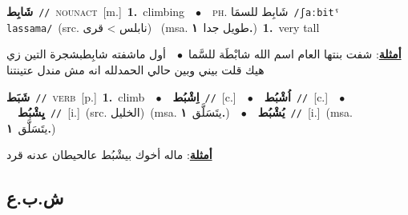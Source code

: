 \documentclass[10pt,a4paper,twoside]{article} %
\begin{document}
\begin{multicols}{2}
{\setlength\topsep{0pt}\textbf{\foreignlanguage{arabic}{شَابِط}}\ {\color{gray}\texttt{//}\color{black}}\ \textsc{noun\textunderscore act}\ [m.]\ \textbf{1.}~climbing\ \ $\bullet$\ \ \textsc{ph.} \color{gray} \foreignlanguage{arabic}{شَابِط للسمَا}\color{black}\ {\color{gray}\texttt{/{\sffamily ʃaːbitˤ lassama}/}\color{black}}\ \color{gray}(src. \foreignlanguage{arabic}{نابلس > قرى})\color{black}\ \color{gray} (msa. \foreignlanguage{arabic}{طويل جدا}~\foreignlanguage{arabic}{\textbf{١.}})\color{black}\ \textbf{1.}~very tall\  \begin{flushright}\color{gray}\foreignlanguage{arabic}{\textbf{\underline{\foreignlanguage{arabic}{أمثلة}}}: شفت بنتها العام اسم الله شابْطَة للسَّما\ $\bullet$\ \  أول ماشفته شابِطبشجرة التين زي هيك قلت بيني وبين حالي الحمدلله انه مش مندل عتينتنا}\end{flushright}\color{black}} \vspace{2mm}

{\setlength\topsep{0pt}\textbf{\foreignlanguage{arabic}{شَبَط}}\ {\color{gray}\texttt{//}\color{black}}\ \textsc{verb}\ [p.]\ \textbf{1.}~climb\ \ $\bullet$\ \ \setlength\topsep{0pt}\textbf{\foreignlanguage{arabic}{اِشْبُط}}\ {\color{gray}\texttt{//}\color{black}}\ [c.]\ \ $\bullet$\ \ \setlength\topsep{0pt}\textbf{\foreignlanguage{arabic}{اُشْبُط}}\ {\color{gray}\texttt{//}\color{black}}\ [c.]\ \ $\bullet$\ \ \setlength\topsep{0pt}\textbf{\foreignlanguage{arabic}{يِشْبُط}}\ {\color{gray}\texttt{//}\color{black}}\ [i.]\ (src. \color{gray}\foreignlanguage{arabic}{الخليل}\color{black})\ \color{gray}(msa. \foreignlanguage{arabic}{يتَسَلَّق}~\foreignlanguage{arabic}{\textbf{١.}})\color{black}\ \ $\bullet$\ \ \setlength\topsep{0pt}\textbf{\foreignlanguage{arabic}{يُشْبُط}}\ {\color{gray}\texttt{//}\color{black}}\ [i.]\ \color{gray}(msa. \foreignlanguage{arabic}{يتَسَلَّق}~\foreignlanguage{arabic}{\textbf{١.}})\color{black}\  \begin{flushright}\color{gray}\foreignlanguage{arabic}{\textbf{\underline{\foreignlanguage{arabic}{أمثلة}}}: ماله أخوك بيشْبُط عالحيطان عدنه قرد}\end{flushright}\color{black}} \vspace{2mm}

\vspace{-3mm}
\subsection*{\color{blue}\foreignlanguage{arabic}{ش.ب.ع}\color{blue}{}} 


\end{multicols}
\end{document}
